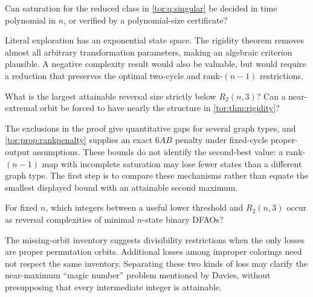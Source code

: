 \documentclass[11pt,a4paper]{article}
\numberwithin{equation}{section}
\theoremstyle{definition}
\theoremstyle{remark}
\begin{document}
\begin{question}\label{tor:q:recognize}
Can saturation for the reduced class in \cref{tor:q:singular} be decided in
time polynomial in $n$, or verified by a polynomial-size certificate?
\end{question}
Literal exploration has an exponential state space. The rigidity theorem
removes almost all arbitrary transformation parameters, making an algebraic
criterion plausible. A negative complexity result would also be valuable, but
would require a reduction that preserves the optimal two-cycle and
rank-$(n-1)$ restrictions.

\begin{question}\label{tor:q:second}
What is the largest attainable reversal size strictly below $R_2(n,3)$? Can a
near-extremal orbit be forced to have nearly the structure in
\cref{tor:thm:rigidity}?
\end{question}
The exclusions in the proof give quantitative gaps for several graph types,
and \cref{tor:prop:rankpenalty} supplies an exact $6AB$ penalty under
fixed-cycle proper-output assumptions. These bounds do not identify the
second-best value: a rank-$(n-1)$ map with incomplete saturation may lose
fewer states than a different graph type. The first step is to compare these
mechanisms rather than equate the smallest displayed bound with an attainable
second maximum.

\begin{question}\label{tor:q:spectrum}
For fixed $n$, which integers between a useful lower threshold and
$R_2(n,3)$ occur as reversal complexities of minimal $n$-state binary DFAOs?
\end{question}
The missing-orbit inventory suggests divisibility restrictions when the only
losses are proper permutation orbits. Additional losses among improper
colorings need not respect the same inventory. Separating these two kinds of
loss may clarify the near-maximum ``magic number'' problem mentioned by
Davies, without presupposing that every intermediate integer is attainable.
\end{document}
